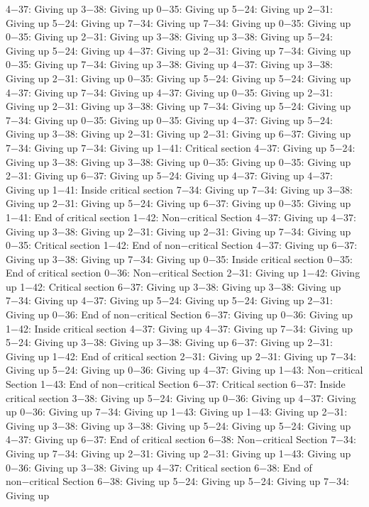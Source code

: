 4−37: Giving up
3−38: Giving up
0−35: Giving up
5−24: Giving up
2−31: Giving up
5−24: Giving up
7−34: Giving up
7−34: Giving up
0−35: Giving up
0−35: Giving up
2−31: Giving up
3−38: Giving up
3−38: Giving up
5−24: Giving up
5−24: Giving up
4−37: Giving up
2−31: Giving up
7−34: Giving up
0−35: Giving up
7−34: Giving up
3−38: Giving up
4−37: Giving up
3−38: Giving up
2−31: Giving up
0−35: Giving up
5−24: Giving up
5−24: Giving up
4−37: Giving up
7−34: Giving up
4−37: Giving up
0−35: Giving up
2−31: Giving up
2−31: Giving up
3−38: Giving up
7−34: Giving up
5−24: Giving up
7−34: Giving up
0−35: Giving up
0−35: Giving up
4−37: Giving up
5−24: Giving up
3−38: Giving up
2−31: Giving up
2−31: Giving up
6−37: Giving up
7−34: Giving up
7−34: Giving up
1−41: Critical section
4−37: Giving up
5−24: Giving up
3−38: Giving up
3−38: Giving up
0−35: Giving up
0−35: Giving up
2−31: Giving up
6−37: Giving up
5−24: Giving up
4−37: Giving up
4−37: Giving up
1−41: Inside critical section
7−34: Giving up
7−34: Giving up
3−38: Giving up
2−31: Giving up
5−24: Giving up
6−37: Giving up
0−35: Giving up
1−41: End of critical section
1−42: Non−critical Section
4−37: Giving up
4−37: Giving up
3−38: Giving up
2−31: Giving up
2−31: Giving up
7−34: Giving up
0−35: Critical section
1−42: End of non−critical Section
4−37: Giving up
6−37: Giving up
3−38: Giving up
7−34: Giving up
0−35: Inside critical section
0−35: End of critical section
0−36: Non−critical Section
2−31: Giving up
1−42: Giving up
1−42: Critical section
6−37: Giving up
3−38: Giving up
3−38: Giving up
7−34: Giving up
4−37: Giving up
5−24: Giving up
5−24: Giving up
2−31: Giving up
0−36: End of non−critical Section
6−37: Giving up
0−36: Giving up
1−42: Inside critical section
4−37: Giving up
4−37: Giving up
7−34: Giving up
5−24: Giving up
3−38: Giving up
3−38: Giving up
6−37: Giving up
2−31: Giving up
1−42: End of critical section
2−31: Giving up
2−31: Giving up
7−34: Giving up
5−24: Giving up
0−36: Giving up
4−37: Giving up
1−43: Non−critical Section
1−43: End of non−critical Section
6−37: Critical section
6−37: Inside critical section
3−38: Giving up
5−24: Giving up
0−36: Giving up
4−37: Giving up
0−36: Giving up
7−34: Giving up
1−43: Giving up
1−43: Giving up
2−31: Giving up
3−38: Giving up
3−38: Giving up
5−24: Giving up
5−24: Giving up
4−37: Giving up
6−37: End of critical section
6−38: Non−critical Section
7−34: Giving up
7−34: Giving up
2−31: Giving up
2−31: Giving up
1−43: Giving up
0−36: Giving up
3−38: Giving up
4−37: Critical section
6−38: End of non−critical Section
6−38: Giving up
5−24: Giving up
5−24: Giving up
7−34: Giving up
